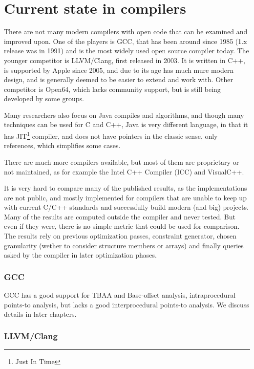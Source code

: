\section{Current state in compilers}

There are not many modern compilers with open code that can be examined and improved
upon. One of the players is GCC, that has been around since 1985
(1.x release was in 1991) and is the most widely used open source compiler
today. The younger competitor is LLVM/Clang, first released in 2003. It is
written in C++, is supported by Apple since 2005, and due to its age has much
mure modern design, and is generally deemed to be easier to extend and work
with. Other competitor is Open64, which lacks community support, but is still
being developed by some groups.

Many researchers also focus on Java compiles and algorithms, and though many
techniques can be used for C and C++, Java is very different language, in that
it has JIT\footnote{Just In Time} compiler, and does not have pointers in the
classic sense, only references, which simplifies some cases.

There are much more compilers available, but most of them are proprietary or not
maintained, as for example the Intel C++ Compiler (ICC) and VisualC++.

It is very hard to compare many of the published results, as the
implementations are not public, and mostly implemented for compilers that are
unable to keep up with current C/C++ standards and successfully build modern
(and big) projects. Many of the results are computed outside the compiler and
never tested. But even if they were, there is no simple metric that could be
used for comparison. The results rely on previous optimization passes,
constraint generator, chosen granularity (wether to consider structure members or
arrays) and finally queries asked by the compiler in later optimization phases.

\subsubsection{GCC}

GCC has a good support for TBAA and Base-offset analysis, intraprocedural
points-to analysis, but lacks a good interprocedural points-to analysis. We
discuss details in later chapters.

\subsubsection{LLVM/Clang}

